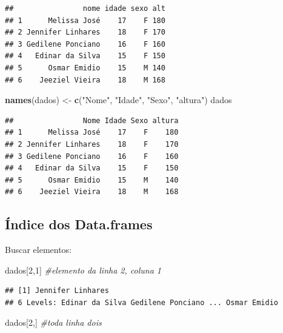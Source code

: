 \documentclass[
]{book}
\newenvironment{Shaded}{\begin{snugshade}}{\end{snugshade}}
\newcommand{\CommentTok}[1]{\textcolor[rgb]{0.56,0.35,0.01}{\textit{#1}}}
\newcommand{\DecValTok}[1]{\textcolor[rgb]{0.00,0.00,0.81}{#1}}
\newcommand{\KeywordTok}[1]{\textcolor[rgb]{0.13,0.29,0.53}{\textbf{#1}}}
\newcommand{\NormalTok}[1]{#1}
\newcommand{\StringTok}[1]{\textcolor[rgb]{0.31,0.60,0.02}{#1}}
\begin{document}
\begin{verbatim}
##                nome idade sexo alt
## 1      Melissa José    17    F 180
## 2 Jennifer Linhares    18    F 170
## 3 Gedilene Ponciano    16    F 160
## 4   Edinar da Silva    15    F 150
## 5      Osmar Emidio    15    M 140
## 6    Jeeziel Vieira    18    M 168
\end{verbatim}

\begin{Shaded}
\begin{Highlighting}[]
\KeywordTok{names}\NormalTok{(dados) <-}\StringTok{ }\KeywordTok{c}\NormalTok{(}\StringTok{"Nome"}\NormalTok{, }\StringTok{"Idade"}\NormalTok{, }\StringTok{"Sexo"}\NormalTok{, }\StringTok{"altura"}\NormalTok{)}
\NormalTok{dados}
\end{Highlighting}
\end{Shaded}

\begin{verbatim}
##                Nome Idade Sexo altura
## 1      Melissa José    17    F    180
## 2 Jennifer Linhares    18    F    170
## 3 Gedilene Ponciano    16    F    160
## 4   Edinar da Silva    15    F    150
## 5      Osmar Emidio    15    M    140
## 6    Jeeziel Vieira    18    M    168
\end{verbatim}

\hypertarget{uxedndice-dos-data.frames}{%
\subsection{Índice dos Data.frames}\label{uxedndice-dos-data.frames}}

Buscar elementos:

\begin{Shaded}
\begin{Highlighting}[]
\NormalTok{dados[}\DecValTok{2}\NormalTok{,}\DecValTok{1}\NormalTok{] }\CommentTok{#elemento da  linha  2, coluna 1}
\end{Highlighting}
\end{Shaded}

\begin{verbatim}
## [1] Jennifer Linhares
## 6 Levels: Edinar da Silva Gedilene Ponciano ... Osmar Emidio
\end{verbatim}

\begin{Shaded}
\begin{Highlighting}[]
\NormalTok{dados[}\DecValTok{2}\NormalTok{,] }\CommentTok{#toda linha dois}
\end{Highlighting}
\end{Shaded}
\end{document}
